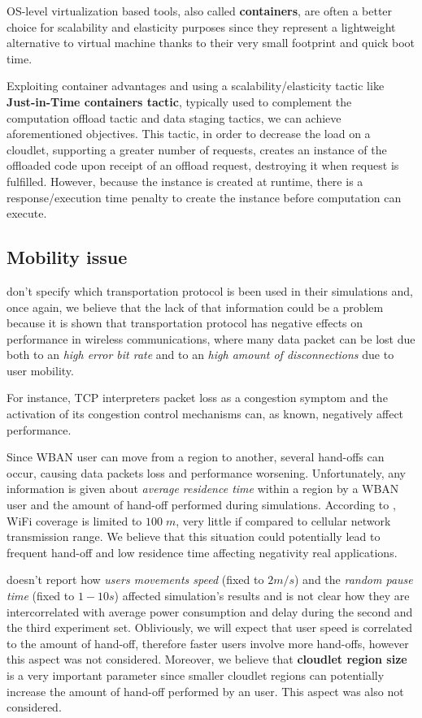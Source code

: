 \documentclass[sigchi]{acmart}
\begin{document}
OS-level virtualization based tools, also called \textbf{containers}, are often a better choice for scalability and elasticity purposes since they represent a lightweight alternative to virtual machine thanks to their very small footprint and quick boot time. 

Exploiting container advantages and using a scalability/elasticity tactic like \textbf{Just-in-Time containers tactic}, typically used to complement the computation offload tactic and data staging tactics, we can achieve aforementioned objectives. This tactic, in order to decrease the load on a cloudlet, supporting a greater number of requests, creates an instance of the offloaded code upon receipt of an offload request, destroying it when request is fulfilled. However, because the instance is created at runtime, there is a response/execution time penalty to create the instance before computation can execute.\cite{DecisionModel}\cite{ArchitecturalTacticsCyberForaging}

\subsection{Mobility issue}

\citet{MSAReport} don't specify which transportation protocol is been used in their simulations and, once again, we believe that the lack of that information could be a problem because it is shown that transportation protocol has negative effects on performance in wireless communications, where many data packet can be lost due both to an \textit{high error bit rate} and to an \textit{high amount of disconnections} due to user mobility. 

For instance, TCP interpreters packet loss as a congestion symptom and the activation of its congestion control mechanisms can, as known, negatively affect performance.\cite{tcp}

Since WBAN user can move from a region to another, several hand-offs can occur, causing data packets loss and performance worsening. Unfortunately, any information is given about \textit{average residence time} within a region by a WBAN user and the amount of hand-off performed during simulations. According to \citet{MSAReport}, WiFi coverage is limited to $100\;m$, very little if compared to cellular network transmission range. We believe that this situation could potentially lead to frequent hand-off and low residence time affecting negativity real applications.

\citet{MSAReport} doesn't report how \textit{users movements speed} (fixed to $2 m/s$) and the \textit{random pause time} (fixed to $1-10 s$) affected simulation's results and is not clear how they are intercorrelated with average power consumption and delay during the second and the third experiment set. Obliviously, we will expect that user speed is correlated to the amount of hand-off, therefore faster users involve more hand-offs, however this aspect was not considered. Moreover, we believe that \textbf{cloudlet region size} is a very important parameter since smaller cloudlet regions can potentially increase the amount of hand-off performed by an user.\cite{tcp} This aspect was also not considered.
\end{document}
